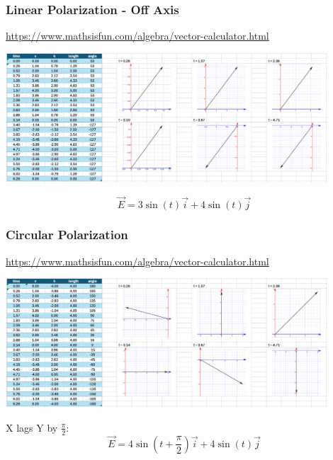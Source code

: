 \documentclass{beamer}
\begin{document}
\begin{frame}\frametitle{Linear Polarization - Off Axis}

\url{https://www.mathsisfun.com/algebra/vector-calculator.html}

\begin{center}
\includegraphics[width=12cm]{fig/pol1.jpg}
\end{center}

\begin{equation}
\vec{E} = 3 \sin{(t)} \vec{i} + 4 \sin{(t)} \vec{j}
\end{equation}

\end{frame}

\begin{frame}\frametitle{Circular Polarization}

\url{https://www.mathsisfun.com/algebra/vector-calculator.html}


\begin{center}
\includegraphics[width=12cm]{fig/pol2.jpg}
\end{center}

X lags Y by $\frac{\pi}{2}$:
\begin{equation}
\vec{E} = 4 \sin{(t + \frac{\pi}{2})} \vec{i} + 4 \sin{(t)} \vec{j}
\end{equation}

\end{frame}
\end{document}
